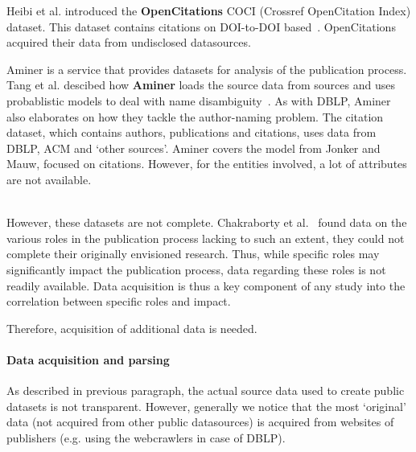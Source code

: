\documentclass{ou-report}
\newcommand{\todo}[1]{{\color{red} TODO: #1}}
\newcommand{\dblp}{DBLP}
\begin{document}
Heibi et al. introduced the \textbf{OpenCitations} COCI (Crossref OpenCitation 
Index) dataset. This dataset contains citations on DOI-to-DOI
based~\cite{DBLP:journals/scientometrics/HeibiPS19}.
OpenCitations acquired their data from undisclosed datasources.

Aminer is a service that provides datasets for analysis of the publication
process.
Tang et al. descibed how \textbf{Aminer} loads the source data from sources and 
uses probablistic models to deal with name disambiguity~\cite{Tang:08KDD}. As 
with DBLP, Aminer also elaborates on how they tackle the author-naming problem.
The citation dataset, which contains authors, publications and citations, uses
data from DBLP, ACM and `other sources'. 
Aminer covers the model from Jonker and Mauw, focused on citations. However,
for the entities involved, a lot of attributes are not available.

\ \\
However, these datasets are not complete. Chakraborty et al.~\cite{CPN2021} found 
data on the various
roles in the publication process lacking to such an extent, they could not complete
their originally envisioned research. Thus, while specific roles may significantly
impact the publication process, data regarding these roles is not readily available.
Data acquisition is thus a key component of any study into the correlation between
specific roles and impact.

Therefore, acquisition of additional data is needed.


\paragraph{Data acquisition and parsing}
As described in previous paragraph, the actual source data used to create public datasets
is not transparent. However, generally we notice that the most `original' 
data (not acquired from other public datasources) is acquired from websites of 
publishers (e.g. using the webcrawlers in case of \dblp{}). 
\end{document}
